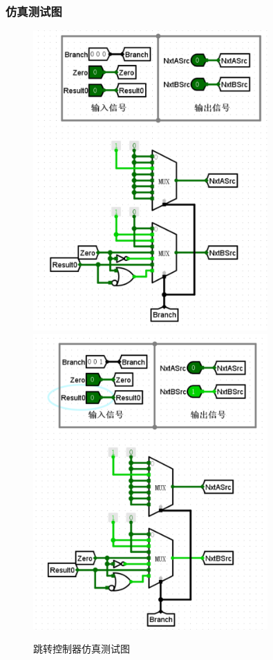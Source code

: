\documentclass{article}
\begin{document}
    \subsubsection{仿真测试图}
    \begin{figure}[H]
    \centering
    \includegraphics[width=0.8\textwidth]{5.5.1.png}
    \includegraphics[width=0.8\textwidth]{5.5.2.png}    
    \caption{跳转控制器仿真测试图}
    \end{figure}
\end{document}
